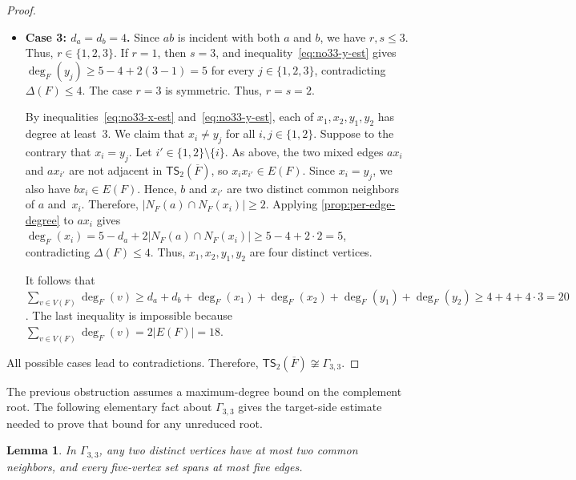 \documentclass[a4paper]{article}
\theoremstyle{plain}
\newtheorem{lemma}[lemma]{Lemma}
\theoremstyle{definition}
\newcommand{\TSsym}{\mathsf{TS}}
\numberwithin{equation}{section}
\begin{document}
\begin{proof}
\begin{itemize}
\item \textbf{Case 3: $d_a=d_b=4$.}
Since $ab$ is incident with both $a$ and $b$, we have $r,s\le 3$.
Thus, $r\in\{1,2,3\}$.
If $r=1$, then $s=3$, and inequality~\eqref{eq:no33-y-est} gives $\deg_F(y_j)\ge 5-4+2(3-1)=5$ for every $j\in\{1,2,3\}$, contradicting $\Delta(F)\le 4$.
The case $r=3$ is symmetric.
Thus, $r=s=2$.

By inequalities~\eqref{eq:no33-x-est} and~\eqref{eq:no33-y-est}, each of $x_1,x_2,y_1,y_2$ has degree at least~$3$.
We claim that $x_i\ne y_j$ for all $i,j\in\{1,2\}$.
Suppose to the contrary that $x_i=y_j$.
Let $i'\in\{1,2\}\setminus\{i\}$.
As above, the two mixed edges $ax_i$ and $ax_{i'}$ are not adjacent in $\TSsym_2(\overline{F})$, so $x_i x_{i'}\in E(F)$.
Since $x_i=y_j$, we also have $bx_i\in E(F)$.
Hence, $b$ and $x_{i'}$ are two distinct common neighbors of $a$ and~$x_i$.
Therefore, $|N_F(a)\cap N_F(x_i)|\ge 2$.
Applying \cref{prop:per-edge-degree} to $ax_i$ gives $\deg_F(x_i)=5-d_a+2|N_F(a)\cap N_F(x_i)|\ge 5-4+2\cdot 2=5$,
contradicting $\Delta(F)\le 4$.
Thus, $x_1,x_2,y_1,y_2$ are four distinct vertices.

It follows that $\displaystyle \sum_{v\in V(F)}\deg_F(v)\ge d_a+d_b+\deg_F(x_1)+\deg_F(x_2)+\deg_F(y_1)+\deg_F(y_2)\ge 4+4+4\cdot 3=20$.
The last inequality is impossible because $\displaystyle \sum_{v\in V(F)}\deg_F(v)=2|E(F)|=18$.
\end{itemize}

All possible cases lead to contradictions.
Therefore, $\TSsym_2(\overline{F})\not\cong \Gamma_{3,3}$.
\end{proof}

The previous obstruction assumes a maximum-degree bound on the complement root.
The following elementary fact about $\Gamma_{3,3}$ gives the target-side estimate needed to prove that bound for any unreduced root.

\begin{lemma}
\label{lem:gamma33-five-vertex-bound}
In $\Gamma_{3,3}$, any two distinct vertices have at most two common neighbors, and every five-vertex set spans at most five edges.
\end{lemma}
\end{document}
